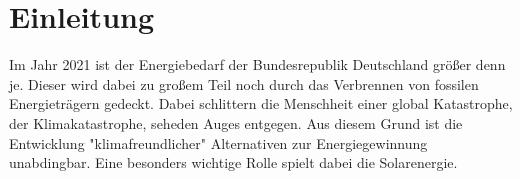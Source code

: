 

\chapter{Einleitung}
\label{chap:einleitung}

Im Jahr 2021 ist der Energiebedarf der Bundesrepublik Deutschland größer denn je. Dieser wird dabei zu großem Teil noch durch das Verbrennen von 
fossilen Energieträgern gedeckt. Dabei schlittern die Menschheit einer global Katastrophe, der 
Klimakatastrophe, seheden Auges entgegen. Aus diesem Grund ist die Entwicklung "klimafreundlicher" Alternativen zur Energiegewinnung unabdingbar.
Eine besonders wichtige Rolle spielt dabei die Solarenergie. 